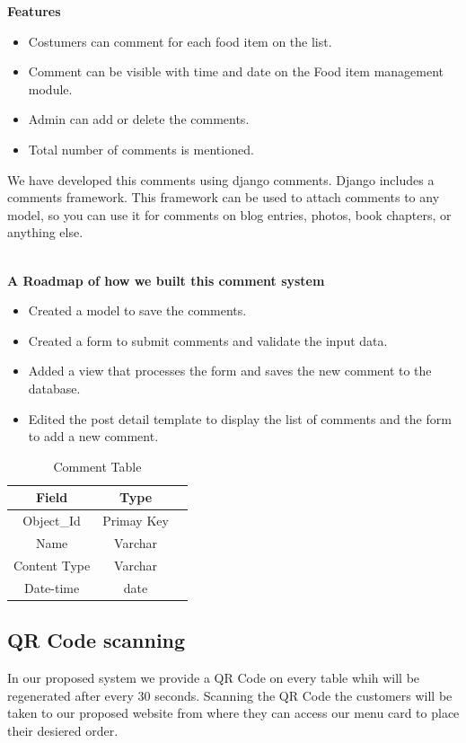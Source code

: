 \documentclass[12pt,a4paper]{report}
\begin{document}
\textbf{Features}
\begin{itemize}
	\item Costumers can comment for each food item on the list.
	\item Comment can be visible  with time and date on the Food item management module.
	\item Admin can add or delete the comments.
	\item Total number of comments is mentioned.
\end{itemize}
\par
We have developed this comments using django comments. Django includes a comments framework. This framework can be used to attach comments to any model, so you can use it for comments on blog entries, photos, book chapters, or anything else. 
\\
\\
\par
\textbf{A Roadmap of how we built this comment system}
\begin{itemize}
	\item Created a model to save the comments.
	\item Created a form to submit comments and validate the input data.
	\item Added a view that processes the form and saves the new comment to the database.
	\item Edited the post detail template to display the list of comments and the form to add a new comment.
\end{itemize}

\begin{table}
  \begin{center}
    \begin{tabular}{ |c|c|c| } 
    \hline
    Field & Type  \\
    \hline
    Object\_Id & Primay Key \\
    \hline
    Name & Varchar \\
    \hline
    Content Type & Varchar \\
    \hline
    Date-time & date \\
    \hline
    \end{tabular}
    \caption{ Comment Table }
    \end{center}
  \end{table}

\subsection{QR Code scanning }
\hspace{0.25cm}
\par
In our proposed system we provide a QR Code on every table whih will be regenerated after every 30 seconds. Scanning the QR Code the customers will be taken to our proposed website from where they can access our menu card to place their desiered order.  
\end{document}
